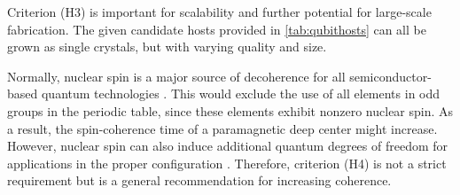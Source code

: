 \begin{table}[!ht]
\centering
\noindent{}
\caption{Table taken from \citeauthor{Gordon2013} \cite{Gordon2013} that lists a number of tetrahedrally coordinated hosts whose band gaps are larger than $2.0$ (eV), and compares it to diamond and Si. All experimental values are from Ref. \cite{Martienssen2005}, except for where explicitly cited otherwise. }
\label{tab:qubithosts}
\end{table}

Criterion (H3) is important for scalability and further potential for large-scale fabrication. The given candidate hosts provided in \autoref{tab:qubithosts} can all be grown as single crystals, but with varying quality and size.

\noindent Normally, nuclear spin is a major source of decoherence for all semiconductor-based quantum technologies \cite{Ladd2010}. This would exclude the use of all elements in odd groups in the periodic table, since these elements exhibit nonzero nuclear spin. As a result, the spin-coherence time of a paramagnetic deep center \cite{Weber2010} might increase. However, nuclear spin can also induce additional quantum degrees of freedom for applications in the proper configuration \cite{Bassett2019}. Therefore, criterion (H4) is not a strict requirement but is a general recommendation for increasing coherence.  %

